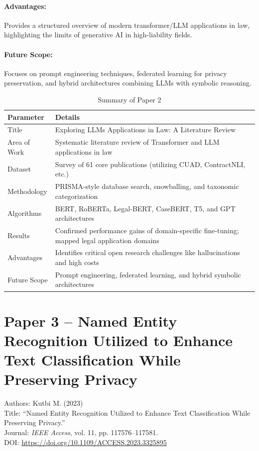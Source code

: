 \documentclass[12pt, a4paper]{report}
\begin{document}
\paragraph{Advantages:}
Provides a structured overview of modern transformer/LLM applications in law, highlighting the limits of generative AI in high-liability fields.

\paragraph{Future Scope:}
Focuses on prompt engineering techniques, federated learning for privacy preservation, and hybrid architectures combining LLMs with symbolic reasoning.

\begin{table}[h]
\centering
\small
\begin{tabular}{p{3.5cm}p{11.5cm}}
\toprule
Parameter & Details \\
\hline
Title & Exploring LLMs Applications in Law: A Literature Review \\
Area of Work & Systematic literature review of Transformer and LLM applications in law \\
Dataset & Survey of 61 core publications (utilizing CUAD, ContractNLI, etc.) \\
Methodology & PRISMA-style database search, snowballing, and taxonomic categorization \\
Algorithms & BERT, RoBERTa, Legal-BERT, CaseBERT, T5, and GPT architectures \\
Results & Confirmed performance gains of domain-specific fine-tuning; mapped legal application domains \\
Advantages & Identifies critical open research challenges like hallucinations and high costs \\
Future Scope & Prompt engineering, federated learning, and hybrid symbolic architectures \\
\bottomrule
\end{tabular}
\caption{Summary of Paper 2}
\label{tab:paper2_summary}
\end{table}

\newpage

\section{Paper 3 -- Named Entity Recognition Utilized to Enhance Text Classification While Preserving Privacy}
\label{sec:paper3}

Authors: Kutbi M. (2023)\\
Title: ``Named Entity Recognition Utilized to Enhance Text Classification While Preserving Privacy.''\\
Journal: \textit{IEEE Access}, vol. 11, pp. 117576--117581.\\
DOI: \url{https://doi.org/10.1109/ACCESS.2023.3325895}
\end{document}
